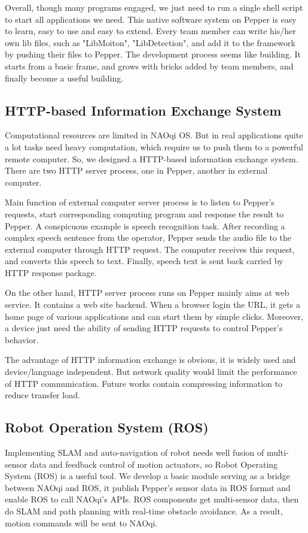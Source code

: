 Overall, though many programs engaged, we just need to run a single shell script to start all applications we need. 
This native software system on Pepper is easy to learn, easy to use and easy to extend. 
Every team member can write his/her own lib files, such as "LibMoiton", "LibDetection", and add it to the framework by pushing their files to Pepper. 
The development process seems like building. It starts from a basic frame, and grows with bricks added by team members, and finally become a useful building.

\subsection{HTTP-based Information Exchange System}
\label{subsec:http}
Computational resources are limited in NAOqi OS. 
But in real applications quite a lot tasks need heavy computation, which require us to push them to a powerful remote computer.
So, we designed a HTTP-based information exchange system. There are two HTTP server process, one in Pepper, another in external computer. 

Main function of external computer server process is to listen to Pepper’s requests, start corresponding computing program and response the result to Pepper. 
A conspicuous example is speech recognition task. 
After recording a complex speech sentence from the operator, Pepper sends the audio file to the external computer through HTTP request. 
The computer receives this request, and converts this speech to text. 
Finally, speech text is sent back carried by HTTP response package. 

On the other hand, HTTP server process runs on Pepper mainly aims at web service. 
It contains a web site backend. 
When a browser login the URL, it gets a home page of various applications and can start them by simple clicks. 
Moreover, a device just need the ability of sending HTTP requests to control Pepper’s behavior. 

The advantage of HTTP information exchange is obvious, it is widely used and device/language independent. 
But network quality would limit the performance of HTTP communication. 
Future works contain compressing information to reduce transfer load.

\subsection{Robot Operation System (ROS)}
\label{subsec:ros}

Implementing SLAM and auto-navigation of robot needs well fusion of multi-sensor data and feedback control of motion actuators, so Robot Operating System (ROS) is a useful tool. 
We develop a basic module serving as a bridge between NAOqi and ROS, it publish Pepper’s sensor data in ROS format and enable ROS to call NAOqi’s APIs. 
ROS components get multi-sensor data, then do SLAM and path planning with real-time obstacle avoidance. 
As a result, motion commands will be sent to NAOqi.